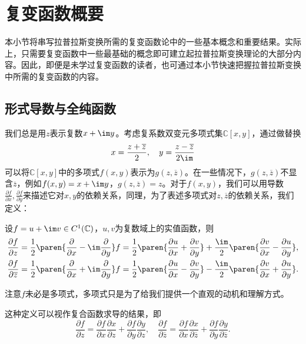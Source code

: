 \section{复变函数概要}\label{sec:Complex}

本小节将串写拉普拉斯变换所需的复变函数论中的一些基本概念和重要结果\cite{Function_Theory}。实际上，只需要复变函数中一些最基础的概念即可建立起拉普拉斯变换理论的大部分内容。因此，即便是未学过复变函数的读者，也可通过本小节快速把握拉普拉斯变换中所需的复变函数的内容。

\subsection{形式导数与全纯函数}\label{sub:derivative_and_holomorphic}
我们总是用$z$表示复数$x+\im y$。考虑复系数双变元多项式集$\mathbb{C}[x,y]$，通过做替换
\begin{equation}
    x=\frac{z+\overline{z}}{2},\quad y=\frac{z-\overline{z}}{2\im}
\end{equation}
可以将$\mathbb{C}[x,y]$中的多项式$f(x,y)$表示为$g(z,\overline{z})$。在一些情况下，$g(z,\overline{z})$不显含$\overline{z}$，例如$f(x,y)=x+\im y$，$g(z,\overline{z})=z$。对于$f(x,y)$，我们可以用导数$\displaystyle\frac{\partial f}{\partial x},\frac{\partial f}{\partial y}$来描述它对$x,y$的依赖关系，同理，为了表述多项式对$z,\overline{z}$的依赖关系，我们定义：
\begin{definition}[形式导数]
    设$f=u+\im v\in C^1(\mathbb{C})$，$u,v$为复数域上的实值函数，则
    \begin{align}
        \frac{\partial f}{\partial z}&=\frac{1}{2}\paren{\frac{\partial}{\partial x}-\im\frac{\partial}{\partial y}}f=\frac{1}{2}\paren{\frac{\partial u}{\partial x}+\frac{\partial v}{\partial y}}+\frac{\im}{2}\paren{\frac{\partial v}{\partial x}-\frac{\partial u}{\partial y}},\\
        \frac{\partial f}{\partial \overline{z}}&=\frac{1}{2}\paren{\frac{\partial}{\partial x}+\im\frac{\partial}{\partial y}}f=\frac{1}{2}\paren{\frac{\partial u}{\partial x}-\frac{\partial v}{\partial y}}-\frac{\im}{2}\paren{\frac{\partial v}{\partial x}+\frac{\partial u}{\partial y}}.
    \end{align}
\end{definition}
注意$f$未必是多项式，多项式只是为了给我们提供一个直观的动机和理解方式。

这种定义可以视作复合函数求导的结果，即
\begin{equation}
    \frac{\partial f}{\partial z}=\frac{\partial f}{\partial x}\frac{\partial x}{\partial z}+\frac{\partial f}{\partial y}\frac{\partial y}{\partial z},\quad \frac{\partial f}{\partial \overline{z}}=\frac{\partial f}{\partial x}\frac{\partial x}{\partial \overline{z}}+\frac{\partial f}{\partial y}\frac{\partial y}{\partial \overline{z}}.
\end{equation}

